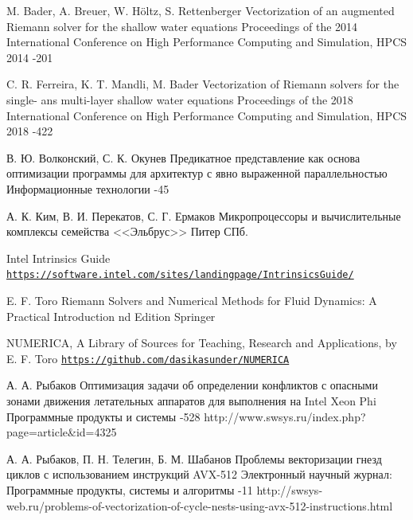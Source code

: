 \documentclass[utf8]{psta}
\begin{document}
\begin{thebibliography}{30}
\by M. Bader, A. Breuer, W. H{\"o}ltz, S. Rettenberger
\paper Vectorization of an augmented Riemann solver for the shallow water equations
\jour Proceedings of the 2014 International Conference on High Performance Computing and Simulation, HPCS 2014
-201

\by C. R. Ferreira, K. T. Mandli, M. Bader
\paper Vectorization of Riemann solvers for the single- ans multi-layer shallow water equations
\jour Proceedings of the 2018 International Conference on High Performance Computing and Simulation, HPCS 2018
-422

\by В. Ю. Волконский, С. К. Окунев
\paper Предикатное представление как основа оптимизации программы для архитектур с явно выраженной параллельностью
\jour Информационные технологии
-45

\by А. К. Ким, В. И. Перекатов, С. Г. Ермаков
\book Микропроцессоры и вычислительные комплексы семейства <<Эльбрус>>
\publ Питер
\publaddr СПб.

\finalinfo Intel Intrinsics Guide\\
\href{https://software.intel.com/sites/landingpage/IntrinsicsGuide/}{{\tt https://software.intel.com/sites/landingpage/IntrinsicsGuide/}}

\by E. F. Toro
\book Riemann Solvers and Numerical Methods for Fluid Dynamics: A Practical Introduction
 nd Edition
\publ Springer

\finalinfo NUMERICA, A Library of Sources for Teaching, Research and Applications, by E. F. Toro
\href{https://github.com/dasikasunder/NUMERICA}{{\tt https://github.com/dasikasunder/NUMERICA}}

\by А. А. Рыбаков
\paper Оптимизация задачи об определении конфликтов с опасными зонами движения летательных аппаратов для выполнения на Intel Xeon Phi
\jour Программные продукты и системы
-528
\URL http://www.swsys.ru/index.php?page=article&id=4325

\by А. А. Рыбаков, П. Н. Телегин, Б. М. Шабанов
\paper Проблемы векторизации гнезд циклов с использованием инструкций AVX-512
\jour Электронный научный журнал: Программные продукты, системы и алгоритмы
-11
\URL http://swsys-web.ru/problems-of-vectorization-of-cycle-nests-using-avx-512-instructions.html


\end{thebibliography}
\end{document}

